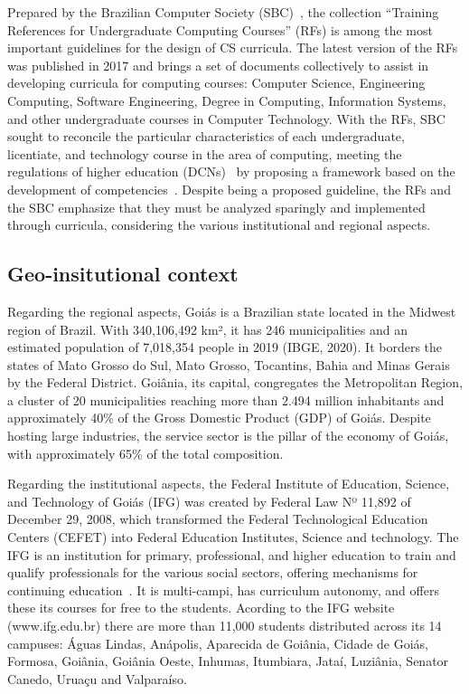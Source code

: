 \documentclass[sigconf, review]{educomp}
\begin{document}
Prepared by the Brazilian Computer Society (SBC)~\cite{sbc2019}, the collection ``Training References for Undergraduate Computing Courses'' (RFs) is among the most important guidelines for the design of CS curricula.
The latest version of the RFs was published in 2017 and brings a set of documents collectively to assist in developing curricula for computing courses: Computer Science, Engineering Computing, Software Engineering, Degree in Computing, Information Systems, and other undergraduate courses in Computer Technology.
With the RFs, SBC sought to reconcile the particular characteristics of each undergraduate, licentiate, and technology course in the area of computing, meeting the regulations of higher education (DCNs)~\cite{dcn2016} by proposing a framework based on the development of competencies~\cite{sbc2019}.
Despite being a proposed guideline, the RFs and the SBC emphasize that they must be analyzed sparingly and implemented through curricula, considering the various institutional and regional aspects.

\subsection{Geo-insitutional context}
Regarding the regional aspects, Goiás is a Brazilian state located in the Midwest region of Brazil.
With 340,106,492 km², it has 246 municipalities and an estimated population of 7,018,354 people in 2019 (IBGE, 2020).
It borders the states of Mato Grosso do Sul, Mato Grosso, Tocantins, Bahia and Minas Gerais by the Federal District.
Goiânia, its capital, congregates the Metropolitan Region, a cluster of 20 municipalities reaching more than 2.494 million inhabitants and approximately 40\% of the Gross Domestic Product (GDP) of Goiás.
Despite hosting large industries, the service sector is the pillar of the economy of Goiás, with approximately 65\% of the total composition.

Regarding the institutional aspects, the Federal Institute of Education, Science, and Technology of Goiás (IFG) was created by Federal Law Nº 11,892 of December 29, 2008, which transformed the Federal Technological Education Centers (CEFET) into Federal Education Institutes, Science and technology.
The IFG is an institution for primary, professional, and higher education to train and qualify professionals for the various social sectors, offering mechanisms for continuing education~\cite{lei2008}.
It is multi-campi, has curriculum autonomy, and offers these its courses for free to the students.
Acording to the IFG website (www.ifg.edu.br) there are more than 11,000 students distributed across its 14 campuses: Águas Lindas, Anápolis, Aparecida de Goiânia, Cidade de Goiás, Formosa, Goiânia, Goiânia Oeste, Inhumas, Itumbiara, Jataí, Luziânia, Senator Canedo, Uruaçu and Valparaíso.
\end{document}
